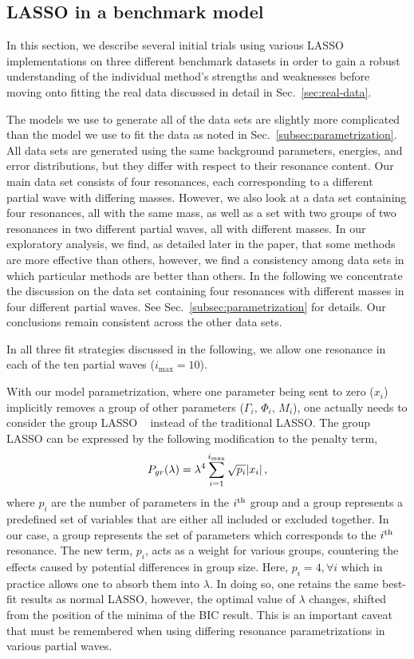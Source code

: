 \documentclass[10pt,aps,prc,superscriptaddress,twoside,twocolumn,nofootinbib,showpacs,preprintnumbers]{revtex4-1}
\newcommand{\be}{\begin{eqnarray}}
\newcommand{\ee}{\end{eqnarray}}
\begin{document}
\subsection{LASSO in a benchmark model }
\label{sec:Benchmark Model Fit Results}

In this section, we describe several initial trials using various LASSO implementations on three different benchmark datasets in order to gain a robust understanding of the individual method's strengths and weaknesses before moving onto fitting the real data discussed in detail in Sec.~\ref{sec:real-data}.

The models we use to generate all of the data sets are slightly more complicated than the model we use to fit the data as noted in Sec.~\ref{subsec:parametrization}. All data sets are generated using the same background parameters, energies, and error distributions, but they differ with respect to their resonance content. Our main data set consists of four resonances, each corresponding to a different partial wave with differing masses. However, we also look at a data set containing four resonances, all with the same mass, as well as a set with two groups of two resonances in two different partial waves, all with different masses. In our exploratory analysis, we find, as detailed later in the paper, that some methods are more effective than others, however, we find a consistency among data sets in which particular methods are better than others. In the following we concentrate the discussion on the data set containing four resonances with different masses in four different partial waves. See Sec.~\ref{subsec:parametrization} for details. Our conclusions remain consistent across the other data sets. 

In all three fit strategies discussed in the following, we allow one resonance in each of the ten partial waves ($i_{\text{max}}=10$). 

With our model parametrization, where one parameter being sent to zero ($x_i$) implicitly removes a group of other parameters ($\Gamma_i,\,\Phi_i,\, M_i$), one actually needs to consider the group LASSO ~\cite{hastie_hastie_tibshirani_friedman_2001} instead of the traditional LASSO. The group LASSO can be expressed by the following modification to the penalty term,
\be
P_{gr}(\lambda)=\lambda^4\sum_{i=1}^{i_{\rm max}} \sqrt{p_i} |x_i|\,,
\label{penalty-group}
\ee
where $p_i$ are the number of parameters in the $i^{\rm th}$ group and a group represents a predefined set of variables that are either all included or excluded together. In our case, a group represents the set of parameters which corresponds to the $i^{\rm th}$ resonance. The new term, $p_i$, acts as a weight for various groups, countering the effects caused by potential differences in group size. Here, $p_i = 4, \forall i$ which in practice allows one to absorb them into $\lambda$. In doing so, one retains the same best-fit results as normal LASSO, however, the optimal value of $\lambda$ changes, shifted from the position of the minima of the BIC result. This is an important caveat that must be remembered when using differing resonance parametrizations in various partial waves.
\end{document}
